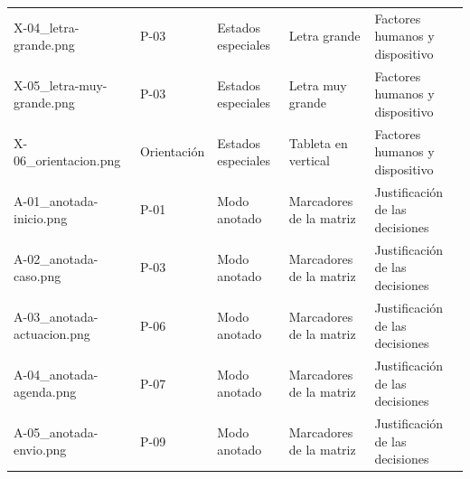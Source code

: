 \begin{longtable}{@{}p{4.2cm}p{1.1cm}p{2.2cm}p{3.2cm}p{3.4cm}@{}}
X-04\_letra-grande.png & P-03 & Estados especiales & Letra grande & Factores humanos y dispositivo \\
X-05\_letra-muy-grande.png & P-03 & Estados especiales & Letra muy grande & Factores humanos y dispositivo \\
X-06\_orientacion.png & Orientación & Estados especiales & Tableta en vertical & Factores humanos y dispositivo \\
A-01\_anotada-inicio.png & P-01 & Modo anotado & Marcadores de la matriz & Justificación de las decisiones \\
A-02\_anotada-caso.png & P-03 & Modo anotado & Marcadores de la matriz & Justificación de las decisiones \\
A-03\_anotada-actuacion.png & P-06 & Modo anotado & Marcadores de la matriz & Justificación de las decisiones \\
A-04\_anotada-agenda.png & P-07 & Modo anotado & Marcadores de la matriz & Justificación de las decisiones \\
A-05\_anotada-envio.png & P-09 & Modo anotado & Marcadores de la matriz & Justificación de las decisiones \\
\end{longtable}